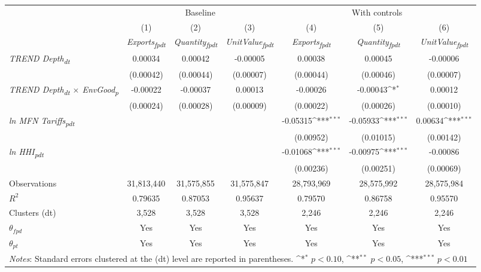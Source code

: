 {
\def\sym#1{\ifmmode^{#1}\else\(^{#1}\)\fi}
\begin{tabular}{l*{6}{c}}
\toprule
&\multicolumn{3}{c}{Baseline}&\multicolumn{3}{c}{With controls}\\\cmidrule(lr){2-4}\cmidrule(lr){5-7}
&(1)&(2)&(3)&(4)&(5)&(6)\\
&\textit{Exports\textsubscript{fpdt}}&\textit{Quantity\textsubscript{fpdt}}&\textit{UnitValue\textsubscript{fpdt}}&\textit{Exports\textsubscript{fpdt}}&\textit{Quantity\textsubscript{fpdt}}&\textit{UnitValue\textsubscript{fpdt}}\\
\midrule
\textit{TREND Depth\textsubscript{dt}} & 0.00034 & 0.00042 & -0.00005 & 0.00038 & 0.00045 & -0.00006\\
 & (0.00042) & (0.00044) & (0.00007) & (0.00044) & (0.00046) & (0.00007)\\
\addlinespace
\textit{TREND Depth\textsubscript{dt} $\times$ EnvGood\textsubscript{p}} & -0.00022 & -0.00037 & 0.00013 & -0.00026 & -0.00043\sym{*} & 0.00012\\
 & (0.00024) & (0.00028) & (0.00009) & (0.00022) & (0.00026) & (0.00010)\\
\addlinespace
\textit{ln MFN Tariffs\textsubscript{pdt}} &  &  &  & -0.05315\sym{***} & -0.05933\sym{***} & 0.00634\sym{***}\\
 &  &  &  & (0.00952) & (0.01015) & (0.00142)\\
\addlinespace
\textit{ln HHI\textsubscript{pdt}} &  &  &  & -0.01068\sym{***} & -0.00975\sym{***} & -0.00086\\
 &  &  &  & (0.00236) & (0.00251) & (0.00069)\\
\midrule
Observations & 31,813,440 & 31,575,855 & 31,575,847 & 28,793,969 & 28,575,992 & 28,575,984\\
$R^{2}$ & 0.79635 & 0.87053 & 0.95637 & 0.79570 & 0.86758 & 0.95570\\
Clusters (dt) & 3,528 & 3,528 & 3,528 & 2,246 & 2,246 & 2,246\\
$\theta_{fpd}$ & Yes & Yes & Yes & Yes & Yes & Yes\\
$\theta_{pt}$ & Yes & Yes & Yes & Yes & Yes & Yes\\
\bottomrule
\multicolumn{7}{l}{\footnotesize \textit{Notes}: Standard errors clustered at the (dt) level are reported in parentheses. \sym{*} \(p<0.10\), \sym{**} \(p<0.05\), \sym{***} \(p<0.01\)}\\
\end{tabular}
}
